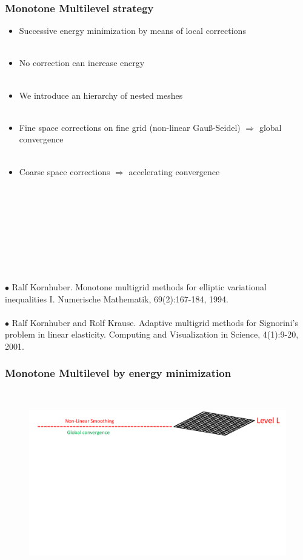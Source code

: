 \documentclass[8pt, oneside]{beamer}   	%
\newcommand{\titlecolor}[1]{\frametitle{\textcolor{dkgrey}{ \textbf{#1}}}}
\begin{document}
\begin{frame}
\titlecolor{Monotone Multilevel strategy}
\begin{itemize}
\item Successive energy minimization by means of local corrections
\\${}$\\
\item No correction can increase energy
\\${}$\\
\item We introduce an hierarchy of nested meshes\\${}$\\
\item Fine space corrections on fine grid (non-linear Gau{\ss}-Seidel) $\Rightarrow$ global convergence
\\${}$\\
\item Coarse space corrections $\Rightarrow$ accelerating convergence
\end{itemize}
${}$\\${}$\\${}$\\${}$\\${}$\\${}$\\${}$\\${}$\\
\tiny{$\bullet$
Ralf Kornhuber. Monotone multigrid methods for elliptic variational inequalities I. Numerische Mathematik, 69(2):167-184, 1994.}
${}$\\${}$\\
\tiny{$\bullet$
 Ralf Kornhuber and Rolf Krause. Adaptive multigrid methods for Signorini's problem in linear elasticity. Computing and Visualization in Science, 4(1):9-20, 2001.}
 
\end{frame}




\begin{frame}
\titlecolor{Monotone Multilevel by energy minimization}
${}$
\begin{figure}[htbp!]
		\centering
	\includegraphics[width=1\textwidth]{img/multigridexplained1.pdf}
\end{figure}
\end{frame}
\end{document}

